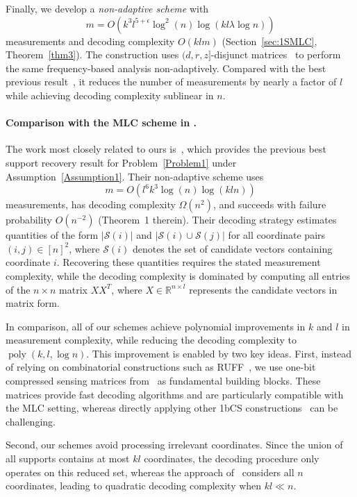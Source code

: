 \documentclass{article}
\newcommand\mc{\mathcal}
\begin{document}
Finally, we develop a {\em non-adaptive scheme} with
\[
m=O\!\left(k^3l^{5+\epsilon}\log^2(n)\log(kl\lambda\log n)\right)
\]
measurements and decoding complexity $O(klm)$ (Section~\ref{sec:1SMLC}, Theorem~\ref{thm3}). The construction uses $(d,r,z]$-disjunct matrices~\cite{chen2008upper} to perform the same frequency-based analysis non-adaptively. Compared with the best previous result~\cite{gandikota2020recovery}, it reduces the number of measurements by nearly a factor of $l$ while achieving decoding complexity sublinear in $n$.

\paragraph{Comparison with the MLC scheme in \cite{gandikota2020recovery}.}
The work most closely related to ours is~\cite{gandikota2020recovery}, which provides the previous best support recovery result for Problem~\ref{Problem1} under Assumption~\ref{Assumption1}. Their non-adaptive scheme uses
\[
m=O(l^6k^3\log(n)\log(kln))
\]
measurements, has decoding complexity $\Omega(n^2)$, and succeeds with failure probability $O(n^{-2})$ (Theorem~1 therein). Their decoding strategy estimates quantities of the form $|\mc{S}(i)|$ and $|\mc{S}(i)\cup\mc{S}(j)|$ for all coordinate pairs $(i,j)\in[n]^2$, where $\mc{S}(i)$ denotes the set of candidate vectors containing coordinate $i$. Recovering these quantities requires the stated measurement complexity, while the decoding complexity is dominated by computing all entries of the $n\times n$ matrix $XX^T$, where $X\in\mathbb{R}^{n\times l}$ represents the candidate vectors in matrix form.

In comparison, all of our schemes achieve polynomial improvements in $k$ and $l$ in measurement complexity, while reducing the decoding complexity to $\operatorname{poly}(k,l,\log n)$. This improvement is enabled by two key ideas. First, instead of relying on combinatorial constructions such as RUFF~\cite{acharya2017improved}, we use one-bit compressed sensing matrices from~\cite{li2025support} as fundamental building blocks. These matrices provide fast decoding algorithms and are particularly compatible with the MLC setting, whereas directly applying other 1bCS constructions~\cite{acharya2017improved,matsumoto2023improved,matsumoto2024robust} can be challenging.

Second, our schemes avoid processing irrelevant coordinates. Since the union of all supports contains at most $kl$ coordinates, the decoding procedure only operates on this reduced set, whereas the approach of~\cite{gandikota2020recovery} considers all $n$ coordinates, leading to quadratic decoding complexity when $kl\ll n$.
\end{document}
